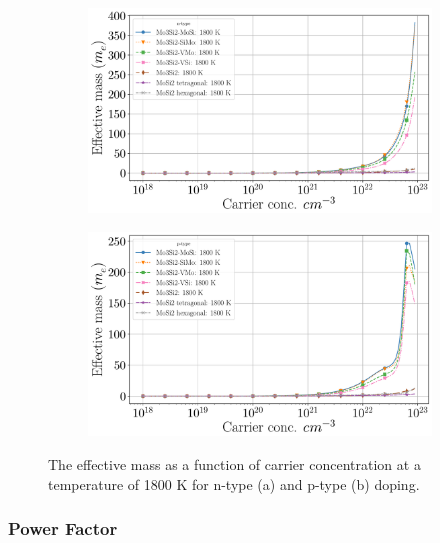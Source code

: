 \documentclass[7.5pt]{article}
\theoremstyle{plain}
\theoremstyle{definition}
\newcommand{\<}{\langle}
\renewcommand{\>}{\rangle}
\begin{document}
\begin{figure}
\centering
\begin{subfigure}{.5\textwidth}
  \centering
  \includegraphics[width=\linewidth]{allmats_E_doping_temp_n}
  \caption{}
  \label{fig:sub1}
\end{subfigure}%
\begin{subfigure}{.5\textwidth}
  \centering
  \includegraphics[width=\linewidth]{allmats_E_doping_temp_p}
  \caption{}
  \label{fig:sub2}
\end{subfigure}
\caption{The effective mass as a function of carrier concentration at a temperature of 1800 K for n-type (a) and p-type (b) doping.}
\label{fig:E-doping}
\end{figure}

\clearpage
\subsubsection{Power Factor}

\end{document}
